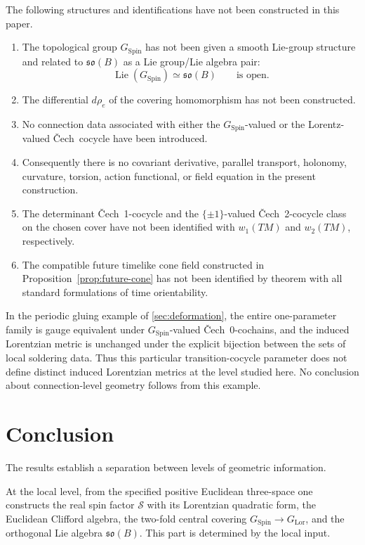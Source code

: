\documentclass[11pt,a4paper]{article}
\theoremstyle{definition}
\theoremstyle{remark}
\newcommand{\Smodel}{\mathcal{S}}
\newcommand{\SpinG}{G_{\mathrm{Spin}}}
\newcommand{\LorG}{G_{\mathrm{Lor}}}
\newcommand{\Cech}{\ifmmode\text{\v{C}ech}\else\v{C}ech\fi}
\newcommand{\soB}{\mathfrak{so}(B)}
\begin{document}
The following structures and identifications have not been constructed in this paper.

\begin{enumerate}
\item The topological group \(\SpinG\) has not been given a smooth Lie-group
      structure and related to \(\soB\) as a Lie group/Lie algebra pair:
\[
   \operatorname{Lie}(\SpinG)\simeq\soB
   \qquad\text{is open.}
\tag{12.1}
\]
\item The differential \(d\rho_e\) of the covering homomorphism has not been
      constructed.
\item No connection data associated with either the \(\SpinG\)-valued or the Lorentz-valued \Cech\ cocycle have been introduced.
\item Consequently there is no covariant derivative, parallel transport,
      holonomy, curvature, torsion, action functional, or field equation in
      the present construction.
\item The determinant \Cech\ 1-cocycle and the \(\{\pm1\}\)-valued \Cech\ 2-cocycle class on the chosen cover have not been identified
      with \(w_1(TM)\) and \(w_2(TM)\), respectively.
\item The compatible future timelike cone field constructed in Proposition~\ref{prop:future-cone}
      has not been identified by theorem with all standard formulations of
      time orientability.
\end{enumerate}

In the periodic gluing example of \cref{sec:deformation}, the entire one-parameter
family is gauge equivalent under \(\SpinG\)-valued \Cech\ 0-cochains, and the induced Lorentzian metric is unchanged under the explicit bijection between the sets of local soldering data.  Thus this particular transition-cocycle parameter does not define
distinct induced Lorentzian metrics at the level studied here.  No conclusion about
connection-level geometry follows from this example.

\clearpage
\section{Conclusion}

The results establish a separation between levels of geometric
information.

At the local level, from the specified positive Euclidean three-space one constructs the real spin factor \(\Smodel\) with its Lorentzian quadratic form, the Euclidean Clifford algebra, the two-fold central covering \(\SpinG\to\LorG\), and the orthogonal Lie algebra \(\mathfrak{so}(B)\).  This part is determined by the local input.
\end{document}
